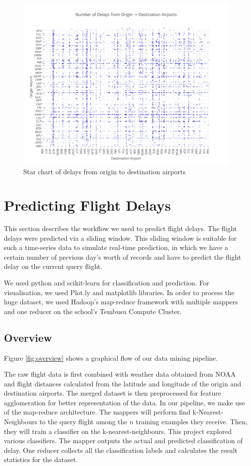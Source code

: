 \documentclass[letterpaper,11pt]{article}
\begin{document}
\begin{figure}[htb]
\centering
\includegraphics[width=1.1\linewidth]{heatmap.png}
\caption{Star chart of delays from origin to destination airports}
\label{fig:heatmap}
\end{figure}

\section{Predicting Flight Delays}
This section describes the workflow we used to predict flight delays. The flight delays were predicted via a sliding window. This sliding window is suitable for such a time-series data to simulate real-time prediction, in which we have a certain number of previous day's worth of records and have to predict the flight delay on the current query flight. 

We used python and scikit-learn for classification and prediction. For visualisation, we used Plot.ly and matplotlib libraries. In order to process the huge dataset, we used Hadoop's map-reduce framework with multiple mappers and one reducer on the school's Tembusu Compute Cluster. 

\subsection{Overview}
Figure \ref{fig:overview} shows a graphical flow of our data mining pipeline. 

The raw flight data is first combined with weather data obtained from NOAA and flight distances calculated from the latitude and longitude of the origin and destination airports. The merged dataset is then preprocessed for feature agglomeration for better representation of the data. In our pipeline, we make use of the map-reduce architecture. The mappers will perform find k-Nearest-Neighbours to the query flight among the $n$ training examples they receive. Then, they will train a classifier on the k-nearest-neighbours. This project explored various classifiers. The mapper outputs the actual and predicted classification of delay. One reducer collects all the classification labels and calculates the result statistics for the dataset. 
\end{document}
